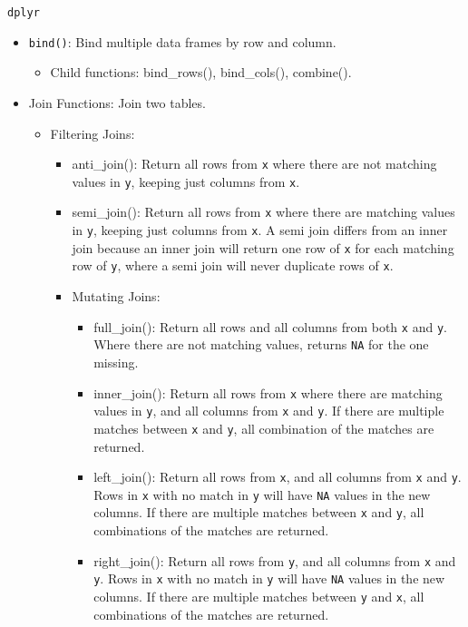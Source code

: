 \documentclass[
]{book}
\providecommand{\tightlist}{%
  \setlength{\itemsep}{0pt}\setlength{\parskip}{0pt}}
\begin{document}
\texttt{dplyr}

\begin{itemize}
\tightlist
\item
  \texttt{bind()}: Bind multiple data frames by row and column.

  \begin{itemize}
  \tightlist
  \item
    Child functions: bind\_rows(), bind\_cols(), combine().
  \end{itemize}
\item
  Join Functions: Join two tables.

  \begin{itemize}
  \tightlist
  \item
    Filtering Joins:

    \begin{itemize}
    \tightlist
    \item
      anti\_join(): Return all rows from \texttt{x} where there are not matching values in \texttt{y}, keeping just columns from \texttt{x}.
    \item
      semi\_join(): Return all rows from \texttt{x} where there are matching values in \texttt{y}, keeping just columns from \texttt{x}. A semi join differs from an inner join because an inner join will return one row of \texttt{x} for each matching row of \texttt{y}, where a semi join will never duplicate rows of \texttt{x}.
    \item
      Mutating Joins:

      \begin{itemize}
      \tightlist
      \item
        full\_join(): Return all rows and all columns from both \texttt{x} and \texttt{y}. Where there are not matching values, returns \texttt{NA} for the one missing.
      \item
        inner\_join(): Return all rows from \texttt{x} where there are matching values in \texttt{y}, and all columns from \texttt{x} and \texttt{y}. If there are multiple matches between \texttt{x} and \texttt{y}, all combination of the matches are returned.
      \item
        left\_join(): Return all rows from \texttt{x}, and all columns from \texttt{x} and \texttt{y}. Rows in \texttt{x} with no match in \texttt{y} will have \texttt{NA} values in the new columns. If there are multiple matches between \texttt{x} and \texttt{y}, all combinations of the matches are returned.
      \item
        right\_join(): Return all rows from \texttt{y}, and all columns from \texttt{x} and \texttt{y}. Rows in \texttt{x} with no match in \texttt{y} will have \texttt{NA} values in the new columns. If there are multiple matches between \texttt{y} and \texttt{x}, all combinations of the matches are returned.
      \end{itemize}
    \end{itemize}
  \end{itemize}
\end{itemize}
\end{document}
